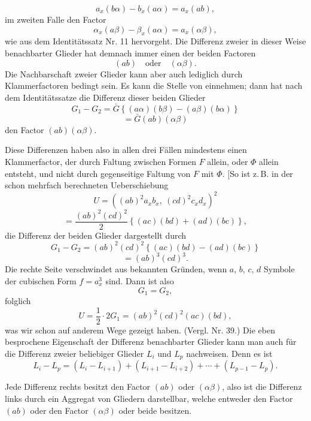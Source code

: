 \[
a_x(b\alpha) - b_x(a\alpha) = a_x(ab), %
\]
im zweiten Falle den Factor
\[
\alpha_x(a\beta) - \beta_x(a\alpha) = a_x(\alpha\beta),
\]
wie aus dem Identitätssatz Nr. 11 hervorgeht.
Die Differenz zweier in dieser Weise benachbarter Glieder hat
demnach immer einen der beiden Factoren
\[
(ab)\quad\text{oder}\quad(\alpha\beta).
\]
Die Nachbarschaft zweier Glieder kann aber auch lediglich durch
Klammerfactoren bedingt sein. Es kann die Stelle von
einnehmen; dann hat nach dem Identitätssatze die Differenz dieser
beiden Glieder
\[
G_1 - G_2 = \bar{G}\left\{(a\alpha)(b\beta) - (a\beta)(b\alpha)\right\}
\]
\[
= \bar{G}(ab)(\alpha\beta)
\]
den Factor $(ab)(\alpha\beta)$.

\glqq Diese Differenzen haben also in allen drei Fällen mindestens
einen Klammerfactor, der durch Faltung zwischen Formen $F$
allein, oder $\Phi$ allein entsteht, und nicht durch gegenseitige
Faltung von $F$ mit $\Phi$.\grqq{}
[So ist z.\,B. in der schon mehrfach berechneten Ueberschiebung
\[
U = \left((ab)^2 a_x b_x,\ (cd)^2 c_x d_x\right)^2
\]
\[
= \frac{(ab)^2(cd)^2}{2}\left\{(ac)(bd) + (ad)(bc)\right\},
\]
die Differenz der beiden Glieder dargestellt durch
\[
G_1 - G_2 = (ab)^2(cd)^2\left\{(ac)(bd) - (ad)(bc)\right\}
\]
\[
= (ab)^3(cd)^3.
\]
Die rechte Seite verschwindet aus bekannten Gründen, wenn $a$,
$b$, $c$, $d$ Symbole der cubischen Form $f = a_x^3$ sind. Dann ist also
\[
G_1 = G_2,
\]
folglich
\[
U = \frac{1}{2}\cdot 2 G_1 = (ab)^2(cd)^2(ac)(bd),
\]
was wir schon auf anderem Wege gezeigt haben. (Vergl. Nr. 39.)
Die eben besprochene Eigenschaft der Differenz benachbarter
Glieder kann man auch für die Differenz zweier beliebiger Glieder
$L_i$ und $L_p$ nachweisen. Denn es ist
\[
L_i - L_p = (L_i - L_{i+1}) + (L_{i+1} - L_{i+2}) + \cdots + (L_{p-1} - L_p).
\]


Jede Differenz rechts besitzt den Factor $(ab)$ oder $(\alpha\beta)$, also ist
die Differenz links durch ein Aggregat von Gliedern darstellbar, welche
entweder den Factor $(ab)$ oder den Factor $(\alpha\beta)$ oder beide besitzen.

